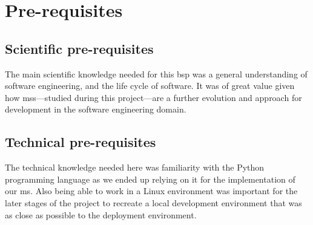 \section{Pre-requisites}%


\subsection{Scientific pre-requisites}

The main scientific knowledge needed for this \gls{bsp} was a general
understanding of software engineering, and the life cycle of software.
It was of great value given how \glspl{ms}---studied during this
project---are a further evolution and approach for development in the software
engineering domain.

\subsection{Technical pre-requisites}

The technical knowledge needed here was familiarity with the Python
programming language as we ended up relying on it for the
implementation of our \gls{ms}. Also being able to work in a Linux
environment was important for the later stages of the project to
recreate a local development environment that was as close as
possible to the deployment environment.
